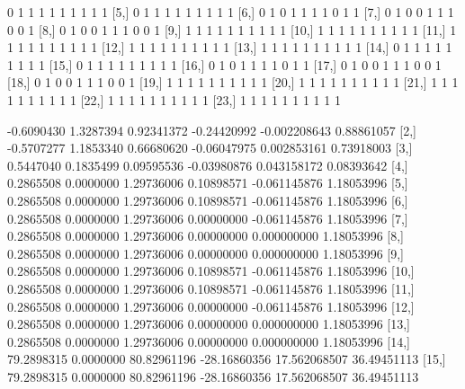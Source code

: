 \documentclass[a4paper]{article}
\begin{document}
\begin{Schunk}
\begin{Soutput}
 [4,]    0    1    1    1    1    1    1    1    1     1
 [5,]    0    1    1    1    1    1    1    1    1     1
 [6,]    0    1    0    1    1    1    1    0    1     1
 [7,]    0    1    0    0    1    1    1    0    0     1
 [8,]    0    1    0    0    1    1    1    0    0     1
 [9,]    1    1    1    1    1    1    1    1    1     1
[10,]    1    1    1    1    1    1    1    1    1     1
[11,]    1    1    1    1    1    1    1    1    1     1
[12,]    1    1    1    1    1    1    1    1    1     1
[13,]    1    1    1    1    1    1    1    1    1     1
[14,]    0    1    1    1    1    1    1    1    1     1
[15,]    0    1    1    1    1    1    1    1    1     1
[16,]    0    1    0    1    1    1    1    0    1     1
[17,]    0    1    0    0    1    1    1    0    0     1
[18,]    0    1    0    0    1    1    1    0    0     1
[19,]    1    1    1    1    1    1    1    1    1     1
[20,]    1    1    1    1    1    1    1    1    1     1
[21,]    1    1    1    1    1    1    1    1    1     1
[22,]    1    1    1    1    1    1    1    1    1     1
[23,]    1    1    1    1    1    1    1    1    1     1
\end{Soutput}
\begin{Soutput}
            [,1]        [,2]        [,3]         [,4]         [,5]        [,6]
 [1,] -0.6090430   1.3287394  0.92341372  -0.24420992 -0.002208643  0.88861057
 [2,] -0.5707277   1.1853340  0.66680620  -0.06047975  0.002853161  0.73918003
 [3,]  0.5447040   0.1835499  0.09595536  -0.03980876  0.043158172  0.08393642
 [4,]  0.2865508   0.0000000  1.29736006   0.10898571 -0.061145876  1.18053996
 [5,]  0.2865508   0.0000000  1.29736006   0.10898571 -0.061145876  1.18053996
 [6,]  0.2865508   0.0000000  1.29736006   0.00000000 -0.061145876  1.18053996
 [7,]  0.2865508   0.0000000  1.29736006   0.00000000  0.000000000  1.18053996
 [8,]  0.2865508   0.0000000  1.29736006   0.00000000  0.000000000  1.18053996
 [9,]  0.2865508   0.0000000  1.29736006   0.10898571 -0.061145876  1.18053996
[10,]  0.2865508   0.0000000  1.29736006   0.10898571 -0.061145876  1.18053996
[11,]  0.2865508   0.0000000  1.29736006   0.00000000 -0.061145876  1.18053996
[12,]  0.2865508   0.0000000  1.29736006   0.00000000  0.000000000  1.18053996
[13,]  0.2865508   0.0000000  1.29736006   0.00000000  0.000000000  1.18053996
[14,] 79.2898315   0.0000000 80.82961196 -28.16860356 17.562068507 36.49451113
[15,] 79.2898315   0.0000000 80.82961196 -28.16860356 17.562068507 36.49451113

\end{Soutput}
\end{Schunk}
\end{document}
